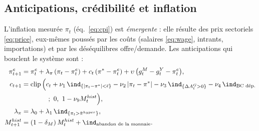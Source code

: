 \documentclass[11pt,a4paper]{article}
\begin{document}
\subsection{Anticipations, crédibilité et inflation}
\label{sec:inflation}
L'inflation mesurée $\pi_t$ (éq.~\eqref{eq:cpi}) est \emph{émergente} : elle résulte des prix sectoriels \eqref{eq:price}, eux-mêmes poussés par les coûts (salaires \eqref{eq:wage}, intrants, importations) et par les déséquilibres offre/demande. Les anticipations qui bouclent le système sont :
\begin{align}
\pi^e_{t+1} &= \pi^e_t + \lambda_\pi\,(\pi_t - \pi^e_t) + c_t\,(\pi^\ast - \pi^e_t) + \upsilon\,\big(g^M_t - g^{Y}_t - \pi^e_t\big), \label{eq:expect}\\
c_{t+1} &= \operatorname{clip}\Big(c_t + \nu_1\,\ind_{\{|\pi_t - \pi^\ast| < \bar\epsilon\}} - \nu_2\,|\pi_t - \pi^\ast| - \nu_3\,\ind_{\{\Delta A^G_t > 0\}} - \nu_4\,\ind_{\text{BC dép.}} \nonumber\\
&\qquad\qquad ;\ 0,\ 1 - \nu_9 M^{hist}_t\Big), \label{eq:cred}\\
\lambda_\pi &= \lambda_0 + \lambda_1\, \ind_{\{\pi_t > \bar\pi^{hyper}\}}, \nonumber\\
M^{hist}_{t+1} &= (1-\delta_M)\, M^{hist}_t + \ind_{\text{abandon de la monnaie}} . \label{eq:hyper}
\end{align}
\end{document}
